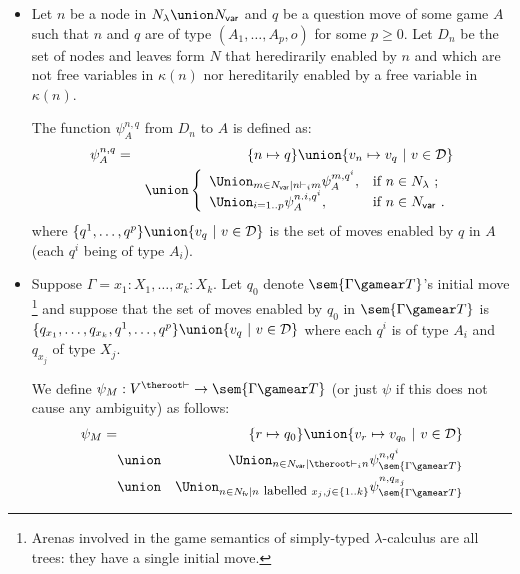 \begin{definition}\hfill
\label{def:psi mapping}

    \begin{itemize}[-]
    \item Let $n$ be a node in $N_\lambda \union N_{\sf var}$ and $q$ be a question move of some game $A$
such that $n$ and $q$ are of type $(A_1,\ldots,A_p,o)$ for some
$p\geq 0$. Let $D_n$ be the set of nodes and leaves form $N$
that heredirarily enabled by $n$ and which are not free
variables in $\kappa(n)$ nor hereditarily enabled by a free
variable in $\kappa(n)$.

The function $\psi^{n,q}_A$ from $D_n$ to $A$ is defined as:
        \begin{eqnarray*}
        \psi^{n,q}_A &=& \{ n \mapsto q \} \union  \{ v_n \mapsto v_q \ | \ v \in \mathcal{D} \}\\
         &&\union \left\{
                        \begin{array}{ll}
                          \Union_{m \in N_{\sf var} | n \vdash_i m} \psi^{m, q^i}_A, & \hbox{if $n\in N_{\lambda}$\ ;} \\
                          \Union_{i=1..p} \psi^{n.i, q^i}_A, & \hbox{if $n\in N_{\sf var}$\ .}
                        \end{array}
                      \right.
        \end{eqnarray*}
        where $\{ q^1, \ldots, q^p \} \union \{ v_q \ | \ v \in \mathcal{D} \}$ is the set of moves enabled by $q$ in $A$ (each $q^i$ being of type $A_i$).

    \item Suppose $\Gamma = x_1:X_1, \ldots ,
    x_k:X_k$. Let $q_0$ denote $\sem{\Gamma\gamear T}$'s
    initial move \footnote{Arenas involved in the game semantics
    of simply-typed $\lambda$-calculus are all trees: they have
    a single initial move.} and suppose that the set of moves
    enabled by $q_0$ in $\sem{\Gamma\gamear T}$ is
     $\{ q_{x_1}, \ldots, q_{x_k}, q^1, \ldots, q^p \} \union \{
    v_q \ | \ v \in \mathcal{D} \}$ where each $q^i$ is of type
    $A_i$ and $q_{x_j}$ of type $X_j$.

    We define $\psi_M : V^{\theroot\vdash} \rightarrow
    \sem{\Gamma\gamear T}$ (or just $\psi$ if this does not
    cause any ambiguity) as follows:
    \begin{eqnarray*}
     \psi_M = && \{ r \mapsto q_0 \}  \union  \{ v_r \mapsto v_{q_0} \ | \ v \in \mathcal{D} \}\\
& \union& \Union_{n \in N_{\sf var} | \theroot\vdash_i n} \psi^{n, q^i}_\sem{\Gamma\gamear T} \\
& \union& \Union_{n \in N_{\sf fv} | n \mbox{ \small labelled } x_j, j \in \{ 1..k \} } \psi^{n, q_{x_j}}_\sem{\Gamma\gamear T}
    \end{eqnarray*}
    \end{itemize}
\end{definition}

